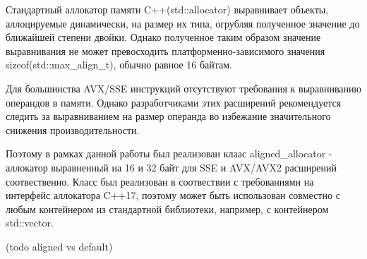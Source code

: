 Стандартный аллокатор памяти C++(std::allocator) выравнивает объекты, аллоцируемые динамически, на размер их типа,
огрубляя полученное значение до ближайшей степени двойки.
Однако полученное таким образом значение выравнивания не может превосходить платформенно-зависимого значения sizeof(std::max\_align\_t),
обычно равное 16 байтам.

Для большинства AVX/SSE инструкций отсутствуют требования к выравниванию операндов в памяти. 
Однако разработчиками этих расширений рекомендуется следить за выравниванием на размер операнда
во избежание значительного снижения производительности.

Поэтому в рамках данной работы был реализован клаас aligned\_allocator - аллокатор выравненный
на 16 и 32 байт для SSE и AVX/AVX2 расширений соотвественно.
Класс был реализован в соотвествии с требованиями на интерфейс аллокатора C++17, поэтому может быть использован совместно с любым
контейнером из стандартной библиотеки, например, с контейнером std::vector.

(todo aligned vs default)

\clearpage
